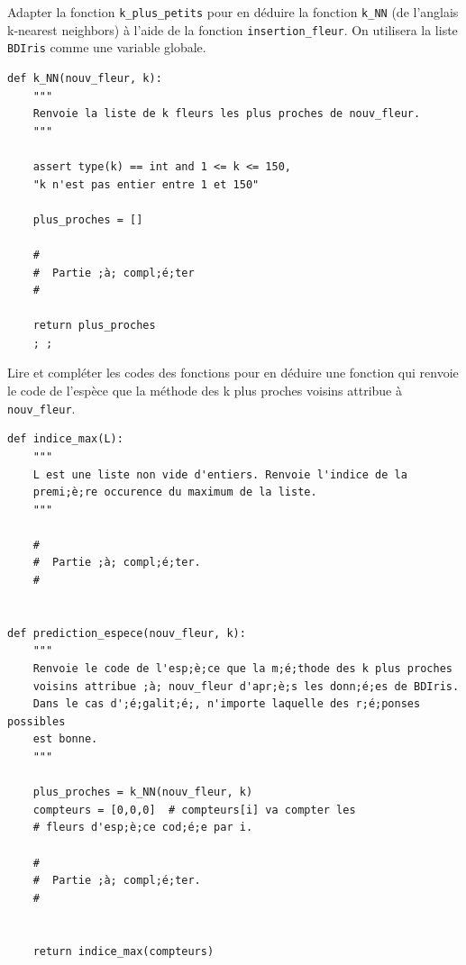 
\medskip

Adapter la fonction \verb+k_plus_petits+ pour en déduire la fonction \verb+k_NN+ (de l'anglais k-nearest neighbors) à l'aide de la fonction \verb+insertion_fleur+. On utilisera la liste \verb+BDIris+ comme une variable globale.

\begin{lstlisting}[escapeinside =;;]
def k_NN(nouv_fleur, k):
    """
    Renvoie la liste de k fleurs les plus proches de nouv_fleur.
    """
    
    assert type(k) == int and 1 <= k <= 150, 
    "k n'est pas entier entre 1 et 150"
    
    plus_proches = []
    
    #
    #  Partie ;à; compl;é;ter
    #
    
    return plus_proches    
    ; ; 
    \end{lstlisting}
\eject
{}

\medskip

Lire et compléter les codes des fonctions pour en déduire une fonction qui renvoie le code de l'espèce que la méthode des k plus proches voisins attribue à \verb+nouv_fleur+.

\begin{lstlisting}[escapeinside =;;]
def indice_max(L):
    """
    L est une liste non vide d'entiers. Renvoie l'indice de la 
    premi;è;re occurence du maximum de la liste.
    """
    
    #
    #  Partie ;à; compl;é;ter. 
    #
    
    
def prediction_espece(nouv_fleur, k):
    """
    Renvoie le code de l'esp;è;ce que la m;é;thode des k plus proches 
    voisins attribue ;à; nouv_fleur d'apr;è;s les donn;é;es de BDIris. 
    Dans le cas d';é;galit;é;, n'importe laquelle des r;é;ponses possibles 
    est bonne.
    """
    
    plus_proches = k_NN(nouv_fleur, k)
    compteurs = [0,0,0]  # compteurs[i] va compter les 
    # fleurs d'esp;è;ce cod;é;e par i.

    #
    #  Partie ;à; compl;é;ter. 
    #


    return indice_max(compteurs)
\end{lstlisting}

\eject






